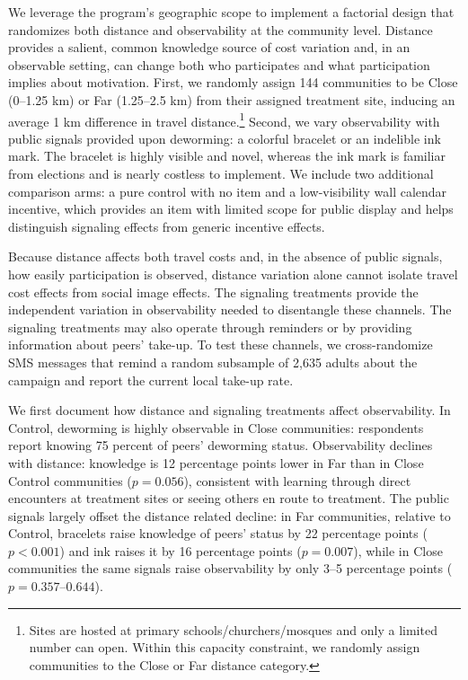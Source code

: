\documentclass[12pt,a4paper]{article}
\begin{document}
We leverage the program’s geographic scope to implement a factorial design that randomizes both distance and observability at the community level. Distance provides a salient, common knowledge source of cost variation and, in an observable setting, can change both who participates and what participation implies about motivation. First, we randomly assign 144 communities to be Close (0–1.25 km) or Far (1.25–2.5 km) from their assigned treatment site, inducing an average 1 km difference in travel distance.\footnote{Sites are hosted at primary schools/churchers/mosques and only a limited number can open. Within this capacity constraint, we randomly assign communities to the Close or Far distance category.} Second, we vary observability with public signals provided upon deworming: a colorful bracelet or an indelible ink mark. The bracelet is highly visible and novel, whereas the ink mark is familiar from elections and is nearly costless to implement. We include two additional comparison arms: a pure control with no item and a low-visibility wall calendar incentive, which provides an item with limited scope for public display and helps distinguish signaling effects from generic incentive effects. 

Because distance affects both travel costs and, in the absence of public signals, how easily participation is observed, distance variation alone cannot isolate travel cost effects from social image effects. The signaling treatments provide the independent variation in observability needed to disentangle these channels. The signaling treatments may also operate through reminders or by providing information about peers’ take-up. To test these channels, we cross-randomize SMS messages that remind a random subsample of 2,635 adults about the campaign and report the current local take-up rate.

We first document how distance and signaling treatments affect observability. In Control, deworming is highly observable in Close communities: respondents report knowing 75 percent of peers’ deworming status. Observability declines with distance: knowledge is 12 percentage points lower in Far than in Close Control communities (\(p=0.056\)), consistent with learning through direct encounters at treatment sites or seeing others en route to treatment. The public signals largely offset the distance related decline: in Far communities, relative to Control, bracelets raise knowledge of peers’ status by 22 percentage points (\(p<0.001\)) and ink raises it by 16 percentage points (\(p=0.007\)), while in Close communities the same signals raise observability by only 3--5 percentage points (\(p=0.357\)--\(0.644\)).
\end{document}
